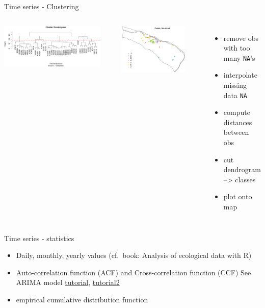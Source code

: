\documentclass[8pt,ignorenonframetext,]{beamer}
\providecommand{\tightlist}{%
  \setlength{\itemsep}{0pt}\setlength{\parskip}{0pt}}
\newcommand{\columnsbegin}{\begin{columns}}
\newcommand{\columnsend}{\end{columns}}
\begin{document}
\begin{frame}[fragile]{Time series - Clustering}

\columnsbegin
{}

\includegraphics[width=0.90000\textwidth]{imgPres/ts_cluster_dendo.png}

\includegraphics[width=0.80000\textwidth]{imgPres/ts_cluster_map.png}

\begin{itemize}
\tightlist
\item
  remove obs with too many \texttt{NA}'s
\item
  interpolate missing data \texttt{NA}
\item
  compute distances between obs
\item
  cut dendrogram --\textgreater{} classes
\item
  plot onto map
\end{itemize}

\columnsend

\end{frame}

\begin{frame}{Time series - statistics}

\begin{itemize}
\tightlist
\item
  Daily, monthly, yearly values (cf.~book: Analysis of ecological data
  with R)
\item
  Auto-correlation function (ACF) and Cross-correlation function (CCF)
  See ARIMA model
  \href{https://www.analyticsvidhya.com/blog/2015/12/complete-tutorial-time-series-modeling/}{tutorial},
  \href{http://a-little-book-of-r-for-time-series.readthedocs.io/en/latest/src/timeseries.html}{tutorial2}
\item
  empirical cumulative distribution function
\end{itemize}

\end{frame}
\end{document}
